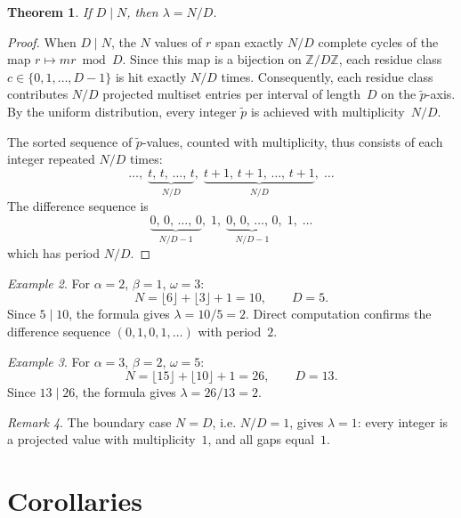 \documentclass[11pt]{article}
\theoremstyle{plain}
\newtheorem{theorem}{Theorem}[section]
\theoremstyle{definition}
\theoremstyle{remark}
\newtheorem{remark}[theorem]{Remark}
\newtheorem{example}[theorem]{Example}
\begin{document}
\begin{theorem}\label{thm:degenerate}
If \(D \mid N\), then \(\lambda = N/D\).
\end{theorem}

\begin{proof}
When \(D \mid N\), the \(N\) values of \(r\) span exactly \(N/D\) complete
cycles of the map \(r \mapsto mr \bmod D\).
Since this map is a bijection on \(\mathbb{Z}/D\mathbb{Z}\), each residue
class \(c \in \{0, 1, \ldots, D-1\}\) is hit exactly \(N/D\) times.
Consequently, each residue class contributes \(N/D\) projected multiset
entries per interval of length~\(D\) on the \(\tilde{p}\)-axis.  By the
uniform distribution, every integer \(\tilde{p}\) is achieved with
multiplicity~\(N/D\).

The sorted sequence of \(\tilde{p}\)-values, counted with multiplicity, thus
consists of each integer repeated \(N/D\) times:
\[
    \ldots,\;
    \underbrace{t,\, t,\, \ldots,\, t}_{N/D},\;
    \underbrace{t+1,\, t+1,\, \ldots,\, t+1}_{N/D},\;
    \ldots
\]
The difference sequence is
\[
    \underbrace{0,\, 0,\, \ldots,\, 0}_{N/D - 1},\; 1,\;
    \underbrace{0,\, 0,\, \ldots,\, 0}_{N/D - 1},\; 1,\;
    \ldots
\]
which has period \(N/D\).
\end{proof}

\begin{example}\label{ex:degenerate}
For \(\alpha = 2\), \(\beta = 1\), \(\omega = 3\):
\[
    N = \lfloor 6 \rfloor + \lfloor 3 \rfloor + 1 = 10,
    \qquad
    D = 5.
\]
Since \(5 \mid 10\), the formula gives \(\lambda = 10/5 = 2\).
Direct computation confirms the difference sequence
\((0, 1, 0, 1, \ldots)\) with period~\(2\).
\end{example}

\begin{example}\label{ex:degenerate2}
For \(\alpha = 3\), \(\beta = 2\), \(\omega = 5\):
\[
    N = \lfloor 15 \rfloor + \lfloor 10 \rfloor + 1 = 26,
    \qquad
    D = 13.
\]
Since \(13 \mid 26\), the formula gives \(\lambda = 26/13 = 2\).
\end{example}

\begin{remark}
The boundary case \(N = D\), i.e. \(N/D = 1\), gives \(\lambda = 1\):
every integer is a projected value with multiplicity~\(1\), and all gaps
equal~\(1\).
\end{remark}

\section{Corollaries}\label{sec:corollaries}
\end{document}
